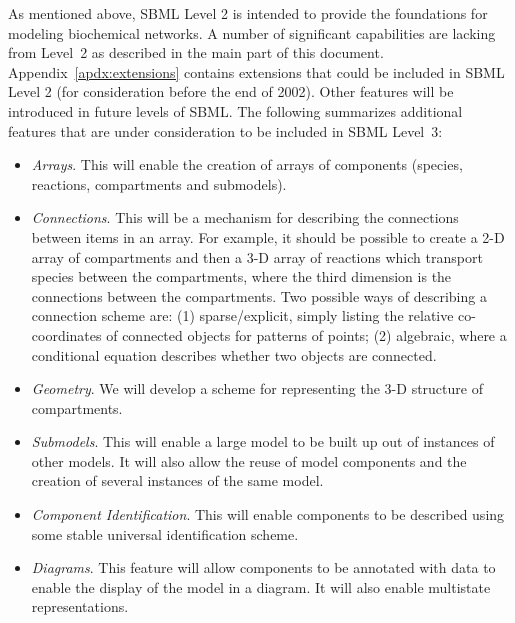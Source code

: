 \documentclass[10pt,twocolumntoc]{cekarticle}
\begin{document}
As mentioned above, SBML Level 2 is intended to provide the foundations for
modeling biochemical networks.  A number of significant capabilities are
lacking from Level~2 as described in the main part of this document.
Appendix~\ref{apdx:extensions} contains extensions that could be included
in SBML Level 2 (for consideration before the end of 2002). Other features
will be introduced in future levels of SBML.  The following summarizes
additional features that are under consideration to be included in SBML
Level~3:
\begin{itemize}

\item \emph{Arrays}.  This will enable the creation of arrays of components
  (species, reactions, compartments and submodels).

\item \emph{Connections}.  This will be a mechanism for describing the
  connections between items in an array.  For example, it should be
  possible to create a 2-D array of compartments and then a 3-D array of
  reactions which transport species between the compartments, where the
  third dimension is the connections between the compartments.  Two
  possible ways of describing a connection scheme are: (1) sparse/explicit,
  simply listing the relative co-coordinates of connected objects for
  patterns of points; (2) algebraic, where a conditional equation describes
  whether two objects are connected.

\item \emph{Geometry}.  We will develop a scheme for representing the 3-D
  structure of compartments.

\item \emph{Submodels}.  This will enable a large model to be built up out
  of instances of other models.  It will also allow the reuse of model
  components and the creation of several instances of the same model.

\item \emph{Component Identification}.  This will enable components to be
  described using some stable universal identification scheme.

\item \emph{Diagrams}.  This feature will allow components to be
annotated
  with data to enable the display of the model in a diagram.  It will also
  enable multistate representations.


\end{itemize}
\end{document}
